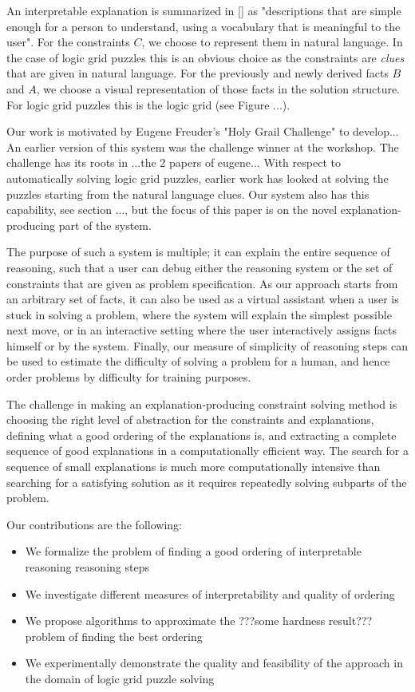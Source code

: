 An interpretable explanation is summarized in [] as "descriptions that are simple enough for a person to understand, using a vocabulary that is meaningful to the user". For the constraints $C$, we choose to represent them in natural language. In the case of logic grid puzzles this is an obvious choice as the constraints are \textit{clues} that are given in natural language. For the previously and newly derived facts $B$ and $A$, we choose a visual representation of those facts in the solution structure. For logic grid puzzles this is the logic grid (see Figure ...).

Our work is motivated by Eugene Freuder's "Holy Grail Challenge" to develop... An earlier version of this system was the challenge winner at the workshop. The challenge has its roots in ...the 2 papers of eugene... With respect to automatically solving logic grid puzzles, earlier work has looked at solving the puzzles starting from the natural language clues. Our system also has this capability, see section ..., but the focus of this paper is on the novel explanation-producing part of the system.

The purpose of such a system is multiple; it can explain the entire sequence of reasoning, such that a user can debug either the reasoning system or the set of constraints that are given as problem specification. As our approach starts from an arbitrary set of facts, it can also be used as a virtual assistant when a user is stuck in solving a problem, where the system will explain the simplest possible next move, or in an interactive setting where the user interactively assigns facts himself or by the system. Finally, our measure of simplicity of reasoning steps can be used to estimate the difficulty of solving a problem for a human, and hence order problems by difficulty for training purposes.

The challenge in making an explanation-producing constraint solving method is choosing the right level of abstraction for the constraints and explanations, defining what a good ordering of the explanations is, and extracting a complete sequence of good explanations in a computationally efficient way. The search for a sequence of small explanations is much more computationally intensive than searching for a satisfying solution as it requires repeatedly solving subparts of the problem.

Our contributions are the following:
\begin{itemize}
	\item We formalize the problem of finding a good ordering of interpretable reasoning reasoning steps
	\item We investigate different measures of interpretability and quality of ordering
	\item We propose algorithms to approximate the ???some hardness result??? problem of finding the best ordering
	\item We experimentally demonstrate the quality and feasibility of the approach in the domain of logic grid puzzle solving
\end{itemize}
